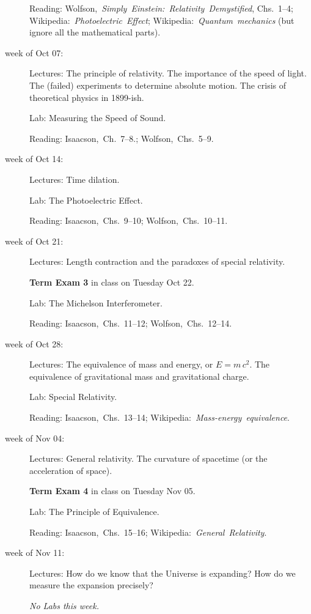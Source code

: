 \documentclass[12pt]{article}
\begin{document}
\begin{description}
  Reading:
  Wolfson,~\textit{Simply~Einstein:~Relativity~Demystified}, Chs.~1--4;
  Wikipedia:~\textit{Photoelectric~Effect};
  Wikipedia:~\textit{Quantum~mechanics} (but ignore all the mathematical parts).

\item[week of Oct 07:] Lectures: The principle of relativity. The
  importance of the speed of light. The (failed) experiments to
  determine absolute motion. The crisis of theoretical physics in
  1899-ish.

  Lab: Measuring the Speed of Sound.

  Reading:
  Isaacson,~Ch.~7--8.;
  Wolfson,~Chs.~5--9.

\item[week of Oct 14:] Lectures: Time dilation.

  Lab: The Photoelectric Effect.

  Reading:
  Isaacson,~Chs.~9--10;
  Wolfson,~Chs.~10--11.

\item[week of Oct 21:] Lectures: Length contraction and the paradoxes
  of special relativity.

  \textbf{Term Exam 3} in class on Tuesday Oct 22.

  Lab: The Michelson Interferometer.

  Reading: Isaacson,~Chs.~11--12;
           Wolfson,~Chs.~12--14.

\item[week of Oct 28:] Lectures: The equivalence of mass and energy,
  or $E = m\,c^2$. The equivalence of gravitational mass and
  gravitational charge.

  Lab: Special Relativity.

  Reading: Isaacson,~Chs.~13--14;
  Wikipedia:~\textit{Mass-energy~equivalence}.

\item[week of Nov 04:] Lectures: General relativity. The curvature of
  spacetime (or the acceleration of space).

  \textbf{Term Exam 4} in class on Tuesday Nov 05.

  Lab: The Principle of Equivalence.

  Reading: Isaacson,~Chs.~15--16;
  Wikipedia:~\textit{General~Relativity}.

\item[week of Nov 11:] Lectures: How do we know that the Universe
  is expanding? How do we measure the expansion precisely?

  \textsl{No Labs this week.}


\end{description}
\end{document}

